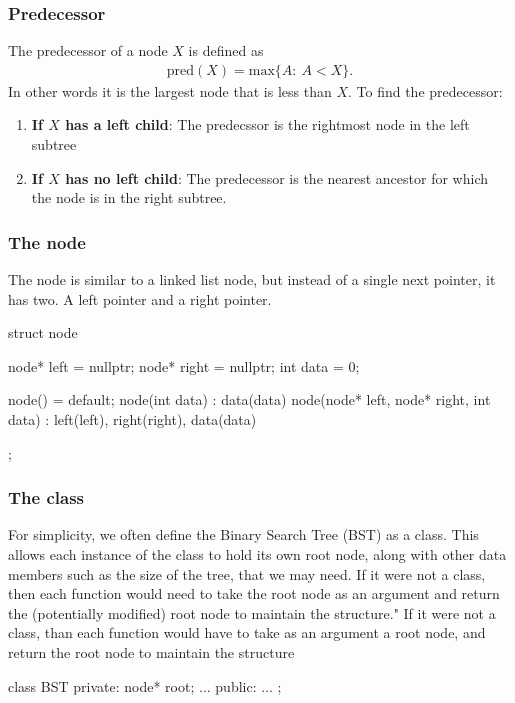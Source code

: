 \documentclass{report}
\begin{document}
\pagebreak 
\subsubsection{Predecessor}
\bigbreak \noindent 
The predecessor of a node $X$ is defined as
\begin{align*}
    \text{pred}(X) = \text{max}\{A:\ A < X\}
.\end{align*}
\bigbreak \noindent 
In other words it is the largest node that is less than $X$. To find the predecessor:
\begin{enumerate}
    \item \textbf{If $X$ has a left child}: The predecssor is the rightmost node in the left subtree
    \item \textbf{If $X$ has no left child}: The predecessor is the nearest ancestor for which the node is in the right subtree.
\end{enumerate}

\bigbreak \noindent 
\subsubsection{The node}
\bigbreak \noindent 
The node is similar to a linked list node, but instead of a single next pointer, it has two. A left pointer and a right pointer.
\bigbreak \noindent 
\begin{cppcode}
    struct node{
        node* left = nullptr;
        node* right = nullptr;
        int data = 0;

        node() = default;
        node(int data) : data(data) {}
        node(node* left, node* right, int data) : left(left), right(right), data(data) {}
    };
\end{cppcode}

\bigbreak \noindent 
\subsubsection{The class}
\bigbreak \noindent 
For simplicity, we often define the Binary Search Tree (BST) as a class. This allows each instance of the class to hold its own root node, along with other data members such as the size of the tree, that we may need. \bigbreak \noindent If it were not a class, then each function would need to take the root node as an argument and return the (potentially modified) root node to maintain the structure."
\bigbreak \noindent 
If it were not a class, than each function would have to take as an argument a root node, and return the root node to maintain the structure
\bigbreak \noindent 
\begin{cppcode}
    class BST {
    private:
        node* root;
        ...
    public:
        ...
    };
\end{cppcode}
\end{document}

